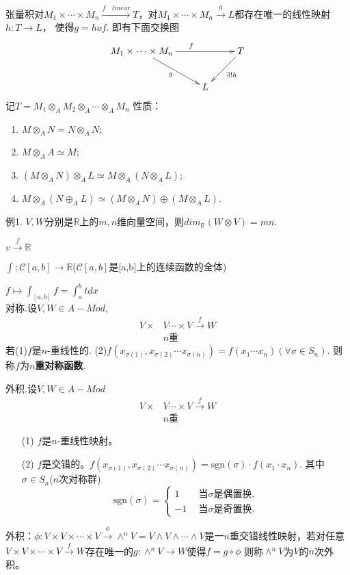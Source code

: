 \documentclass[UTF8]{article}
\begin{document}
张量积对$M_{1} \times \cdots \times M_{n} \xrightarrow{f\quad linear}T$，对$M_{1} \times \cdots \times M_{n} \xrightarrow{g}L$都存在唯一的线性映射$h:T\longrightarrow L$，
使得$g=hof$.
即有下面交换图
$$
\xymatrix{
	M_{1} \times \cdots \times M_{n}\ar[rr]^{f}\ar[rd]_{g}& &T\ar[ld]^{\exists!h}\\
	&L&
}
$$
记$T=M_{1} \otimes_A M_{2}\otimes_A \cdots\otimes_A M_{n}$
性质：
\begin{enumerate}
	\item $M \otimes_{A} N=N \otimes_{A} N;$
	\item $M \otimes_{A} A\simeq M;$
	\item $(M \otimes_{A} N)\otimes_{A} L\simeq M \otimes_{A} (N \otimes_{A} L);$
	\item $M \otimes_{A}\left(N \oplus_{A} L\right)\simeq \left(M \otimes_{A} N\right)\oplus(M\otimes_{A} L).$
\end{enumerate}

例1. $V,W$分别是$\mathbb{R}$上的$m,n$维向量空间，则$dim_\mathbb{R}(W\otimes V)=mn.$

$v \stackrel{f}{\longrightarrow} \mathbb{R}$

$\int:\mathscr{C}[a, b]  \longrightarrow \mathbb{R}$($\mathscr{C}[a, b]$是[a,b]上的连续函数的全体)

$f\mapsto \int_{[a, b]} f=\int_{a}^{b} t d x$\\


\noindent 对称.设$V,W\in A-Mod$,\\
$$\begin{aligned}
V\times &V\cdots\times V\stackrel{f}{\longrightarrow}W\\
&n\text{重}
\end{aligned}$$
若(1)$f$是$n$-重线性的.
(2)$f(x_{\sigma(1)},x_{\sigma(2)}\cdots x_{\sigma(n)})=f(x_1\cdots x_n)(\forall \sigma\in S_n).$
则称$f$为\textbf{$n$重对称函数}.


外积.设$V,W\in A-Mod$\\
$$\begin{aligned}
V\times &V\cdots\times V\stackrel{f}{\longrightarrow}W\\
&n\text{重}
\end{aligned}$$
\begin{itemize}
	\item[(1)] $f$是$n$-重线性映射。
	\item[(2)] $f$是交错的。$f(x_{\sigma(1)},x_{\sigma(2)}\cdots x_{\sigma(n)})=\mathrm{sgn}(\sigma)\cdot f(x_1\cdot x_n)$.
	其中$\sigma\in S_n$($n$次对称群)\\
	$$\mathrm{sgn}(\sigma)=\left\{\begin{array}{l}
	1\qquad\text{当}\sigma\text{是偶置换,}\\
	-1~\quad\text{当}\sigma\text{是奇置换.}
	\end{array}\right.$$
\end{itemize}
外积：$\phi:V\times V\times \cdots\times V\xrightarrow{\phi}\wedge^{n}V=V\wedge V\wedge \cdots\wedge V$是一$n$重交错线性映射，若对任意$V\times V\times \cdots\times V\xrightarrow{f}W$存在唯一的$g:\wedge^{n}V\longrightarrow W$使得$f=g\circ \phi$
则称$\wedge^{n}V$为$V$的$n$次外积。
\end{document}
